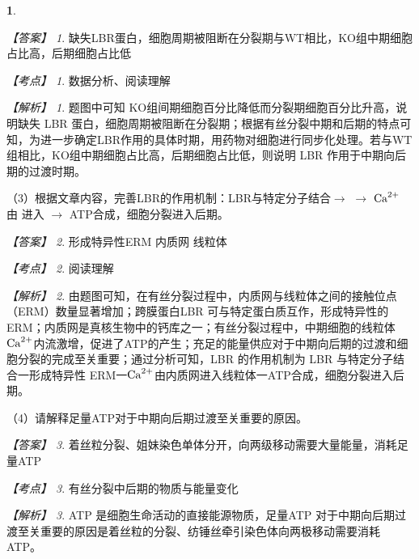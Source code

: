 \documentclass[UTF8, 10pt, a4paper, oneside]{ctexart}
\newcommand{\blank}{ \underbar{\quad$\blacktriangle$\quad} }%
\theoremstyle{definition}
\newtheorem{exercise}{}
\theoremstyle{remark}
\newtheorem*{answer}{【答案】}
\newtheorem*{point}{【考点】}      %
\newtheorem*{explanation}{【解析】}     %
\theoremstyle{plain}
\begin{document}
\begin{exercise}
    \begin{answer}
        缺失LBR蛋白，细胞周期被阻断在分裂期\qquad 与WT相比，KO组中期细胞占比高，后期细胞占比低
    \end{answer}
    \begin{point}
        数据分析、阅读理解
    \end{point}
    \begin{explanation}
        题图中可知 KO组间期细胞百分比降低而分裂期细胞百分比升高，说明缺失 LBR 蛋白，细胞周期被阻断在分裂期；根据有丝分裂中期和后期的特点可知，为进一步确定LBR作用的具体时期，用药物对细胞进行同步化处理。若与WT组相比，KO组中期细胞占比高，后期细胞占比低，则说明 LBR 作用于中期向后期的过渡时期。
    \end{explanation}

    （3）根据文章内容，完善LBR的作用机制：LBR与特定分子结合$\rightarrow$ \blank $\rightarrow$ $\ce{Ca^2+}$ 由 \blank 进入\blank $\rightarrow$ ATP合成，细胞分裂进入后期。

    \begin{answer}
        形成特异性ERM \qquad 内质网 \qquad 线粒体
    \end{answer}
    \begin{point}
        阅读理解
    \end{point}
    \begin{explanation}
        由题图可知，在有丝分裂过程中，内质网与线粒体之间的接触位点（ERM）数量显著增加；跨膜蛋白LBR 可与特定蛋白质互作，形成特异性的 ERM；内质网是真核生物中的钙库之一；有丝分裂过程中，中期细胞的线粒体 $\ce{Ca^2+}$内流激增，促进了ATP的产生；充足的能量供应对于中期向后期的过渡和细胞分裂的完成至关重要；通过分析可知，LBR 的作用机制为 LBR 与特定分子结合一形成特异性 ERM一$\ce{Ca^2+}$由内质网进入线粒体一ATP合成，细胞分裂进入后期。
    \end{explanation}

    （4）请解释足量ATP对于中期向后期过渡至关重要的原因。

    \begin{answer}
        着丝粒分裂、姐妹染色单体分开，向两级移动需要大量能量，消耗足量ATP
    \end{answer}
    \begin{point}
        有丝分裂中后期的物质与能量变化
    \end{point}
    \begin{explanation}
        ATP 是细胞生命活动的直接能源物质，足量ATP 对于中期向后期过渡至关重要的原因是着丝粒的分裂、纺锤丝牵引染色体向两极移动需要消耗 ATP。
    \end{explanation}


\end{exercise}
\end{document}
